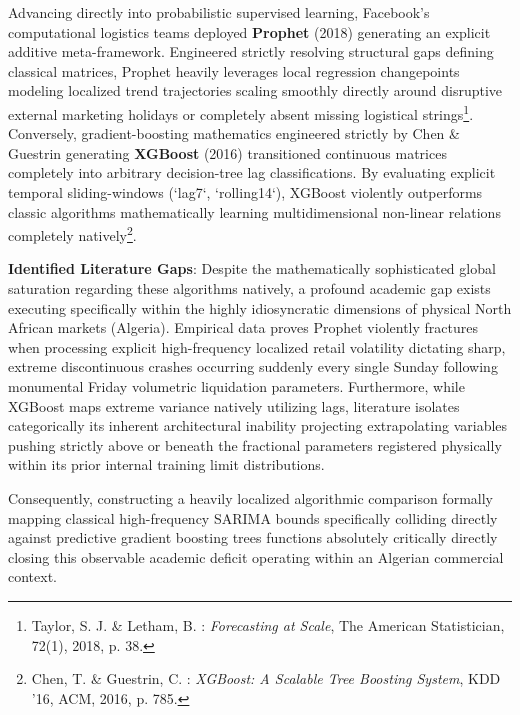 \documentclass[12pt,a4paper]{report}
\begin{document}
Advancing directly into probabilistic supervised learning, Facebook’s computational logistics teams deployed \textbf{Prophet} (2018) generating an explicit additive meta-framework. Engineered strictly resolving structural gaps defining classical matrices, Prophet heavily leverages local regression changepoints modeling localized trend trajectories scaling smoothly directly around disruptive external marketing holidays or completely absent missing logistical strings\footnote{Taylor, S. J. \& Letham, B. : \textit{Forecasting at Scale}, The American Statistician, 72(1), 2018, p. 38.}.
Conversely, gradient-boosting mathematics engineered strictly by Chen & Guestrin generating \textbf{XGBoost} (2016) transitioned continuous matrices completely into arbitrary decision-tree lag classifications. By evaluating explicit temporal sliding-windows (`lag7`, `rolling14`), XGBoost violently outperforms classic algorithms mathematically learning multidimensional non-linear relations completely natively\footnote{Chen, T. \& Guestrin, C. : \textit{XGBoost: A Scalable Tree Boosting System}, KDD '16, ACM, 2016, p. 785.}.

\textbf{Identified Literature Gaps}: 
Despite the mathematically sophisticated global saturation regarding these algorithms natively, a profound academic gap exists executing specifically within the highly idiosyncratic dimensions of physical North African markets (Algeria). Empirical data proves Prophet violently fractures when processing explicit high-frequency localized retail volatility dictating sharp, extreme discontinuous crashes occurring suddenly every single Sunday following monumental Friday volumetric liquidation parameters. Furthermore, while XGBoost maps extreme variance natively utilizing lags, literature isolates categorically its inherent architectural inability projecting extrapolating variables pushing strictly above or beneath the fractional parameters registered physically within its prior internal training limit distributions. 

Consequently, constructing a heavily localized algorithmic comparison formally mapping classical high-frequency SARIMA bounds specifically colliding directly against predictive gradient boosting trees functions absolutely critically directly closing this observable academic deficit operating within an Algerian commercial context.
\end{document}
